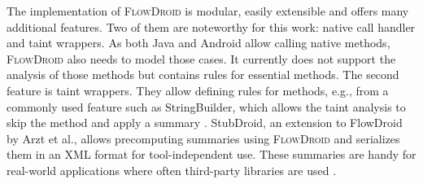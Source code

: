 \documentclass[../draft.tex]{subfiles}
\begin{document}
    The implementation of \textsc{FlowDroid} is modular, easily extensible and offers many additional features. 
    Two of them are noteworthy for this work: native call handler and taint wrappers. 
    As both Java and Android allow calling native methods, \textsc{FlowDroid} also needs to model those cases. 
    It currently does not support the analysis of those methods but contains rules for essential methods. 
    The second feature is taint wrappers. 
    They allow defining rules for methods, e.g., from a commonly used feature such as StringBuilder, which allows the taint analysis to skip the method and apply a summary \cite{Arzt2014}. 
    StubDroid, an extension to FlowDroid by Arzt et al., allows precomputing summaries using \textsc{FlowDroid} and serializes them in an XML format for tool-independent use. 
    These summaries are handy for real-world applications where often third-party libraries are used \cite{Arzt2017PhD}.
\end{document}
